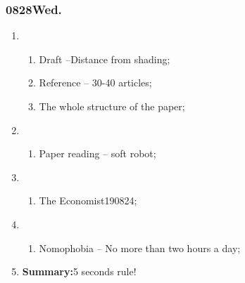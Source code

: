 \subsubsection{0828Wed.}
\begin{enumerate}
	\item \ncquaone
	\begin{enumerate}[(1)]
		\item Draft --Distance from shading;\rightundoneBlack
		\item Reference -- 30-40 articles;\rightundoneBlack
		\item The whole structure of the paper;\rightundoneBlack
	\end{enumerate}
	
	\item \ncquatwo	
	\begin{enumerate}[(1)]
		\item Paper reading -- soft robot;\rightundoneBlack
	\end{enumerate}
	
	\item \ncquathree
	\begin{enumerate}[(1)]
		\item The Economist190824;\rightundoneBlack
	\end{enumerate}
	
	\item \ncquafour	
	\begin{enumerate}[(1)]
		\item Nomophobia --  No more than two hours a day;\rightundoneBlack
	\end{enumerate}
	\item \textbf{Summary:}5 seconds rule! 
\end{enumerate}
